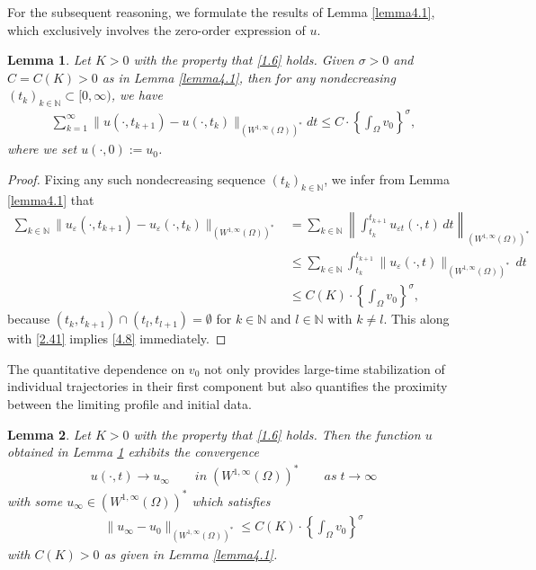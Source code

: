 \documentclass[12pt]{article}
\theoremstyle{plain}
\newtheorem{lemma}{Lemma}[section]
\theoremstyle{definition}
\numberwithin{equation}{section}
\begin{document}
For the subsequent reasoning, we formulate the results of  Lemma  \ref{lemma4.1}, which  exclusively involves the zero-order expression of $u$.
\begin{lemma}\label{lemma4.2}
Let $K>0$ with the property that \eqref{1.6} holds. Given
  $\sigma>0$ and $C=C(K)>0$ as in Lemma \ref{lemma4.1}, then for any nondecreasing $(t_{k})_{k\in \mathbb{N}}\subset [0,\infty)$, we have
\begin{align}\label{4.8}
   \sum_{k=1}^{\infty}\|u(\cdot,t_{k+1})-u(\cdot,t_{k})\|_{(W^{1,\infty}(\Omega))^*}dt\leq C\cdot \left\{\int_\Omega v_{0}\right\}^{\sigma},
\end{align}
where  we set $u(\cdot,0):=u_0$.
\end{lemma}
\begin{proof}
     Fixing any such nondecreasing sequence $(t_k)_{k \in \mathbb{N}}$, we infer from Lemma \ref{lemma4.1} that
     \begin{align*}
         \sum_{k\in \mathbb{N}} \| u_{\varepsilon}(\cdot, t_{k+1}) - u_{\varepsilon}(\cdot, t_k) \|_{(W^{1,\infty}(\Omega))^*}
    &= \sum_{k\in \mathbb{N}} \left\| \int_{t_k}^{t_{k+1}} u_{\varepsilon t}(\cdot, t) \, dt \right\|_{(W^{1,\infty}(\Omega))^*}\\
    &\leq \sum_{k\in \mathbb{N}} \int_{t_k}^{t_{k+1}} \| u_{\varepsilon}(\cdot, t) \|_{(W^{1,\infty}(\Omega))^*} \, dt\\
    &\leq C(K) \cdot \left\{\int_\Omega v_{0}\right\}^{\sigma},
     \end{align*}
     because $(t_k, t_{k+1})\cap(t_l, t_{l+1})=\emptyset$ for $k \in \mathbb{N}$ and $l \in \mathbb{N}$ with $k \neq l$. This along with \eqref{2.41} implies \eqref{4.8} immediately.
\end{proof}
The quantitative dependence on $v_0$ not only provides large-time stabilization of individual trajectories in their first component but also quantifies the proximity between the limiting profile and initial data.
\begin{lemma}\label{lemma4.3}
Let $K>0$ with the property that \eqref{1.6} holds.  Then  the function $u$ obtained in Lemma \ref{lemma4.2} exhibits the convergence
\begin{align}\label{4.9}
    u(\cdot,t)\rightarrow u_{\infty}\qquad in\;(W^{1,\infty}(\Omega))^*\qquad as\; t\to \infty
\end{align}
with some $u_{\infty}\in(W^{1,\infty}(\Omega))^*$ which satisfies
\begin{align}\label{4.10}
    \|u_{\infty}-u_0\|_{(W^{1,\infty}(\Omega))^*}\leq C(K)\cdot \left\{\int_\Omega v_{0}\right\}^{\sigma}
\end{align}
with $C(K)>0$  as given in Lemma \ref{lemma4.1}.
\end{lemma}
\end{document}
